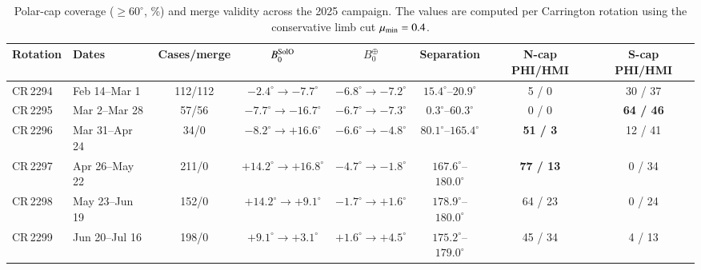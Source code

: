 \documentclass{aa}
\begin{document}
\begin{table}
\caption{Polar-cap coverage ($\ge 60^{\circ}$, \%) and merge validity across the 2025 campaign. The values are computed per Carrington rotation using the conservative limb cut $\mu_{\rm min}=0.4$.}
\label{tab:campaign}
\centering
\scriptsize
\begin{tabular}{llcccccc}
\hline\hline
Rotation & Dates & Cases/merge & $B_0^{\rm SolO}$ & $B_0^{\oplus}$ & Separation & N-cap PHI/HMI & S-cap PHI/HMI \\
\hline
CR\,2294 & Feb 14--Mar 1  & 112/112 & $-2.4^{\circ}\rightarrow -7.7^{\circ}$  & $-6.8^{\circ}\rightarrow -7.2^{\circ}$  & $15.4^{\circ}$--$20.9^{\circ}$   & 5 / 0   & 30 / 37 \\
CR\,2295 & Mar 2--Mar 28  & 57/56   & $-7.7^{\circ}\rightarrow -16.7^{\circ}$ & $-6.7^{\circ}\rightarrow -7.3^{\circ}$  & $0.3^{\circ}$--$60.3^{\circ}$  & 0 / 0   & \textbf{64 / 46} \\
CR\,2296 & Mar 31--Apr 24 & 34/0    & $-8.2^{\circ}\rightarrow +16.6^{\circ}$ & $-6.6^{\circ}\rightarrow -4.8^{\circ}$  & $80.1^{\circ}$--$165.4^{\circ}$  & \textbf{51 / 3}  & 12 / 41 \\
CR\,2297 & Apr 26--May 22 & 211/0   & $+14.2^{\circ}\rightarrow +16.8^{\circ}$ & $-4.7^{\circ}\rightarrow -1.8^{\circ}$ & $167.6^{\circ}$--$180.0^{\circ}$ & \textbf{77 / 13} & 0 / 34 \\
CR\,2298 & May 23--Jun 19 & 152/0   & $+14.2^{\circ}\rightarrow +9.1^{\circ}$  & $-1.7^{\circ}\rightarrow +1.6^{\circ}$ & $178.9^{\circ}$--$180.0^{\circ}$ & 64 / 23 & 0 / 24 \\
CR\,2299 & Jun 20--Jul 16 & 198/0   & $+9.1^{\circ}\rightarrow +3.1^{\circ}$   & $+1.6^{\circ}\rightarrow +4.5^{\circ}$ & $175.2^{\circ}$--$179.0^{\circ}$  & 45 / 34 & 4 / 13 \\
\hline
\end{tabular}
\end{table}
\end{document}
